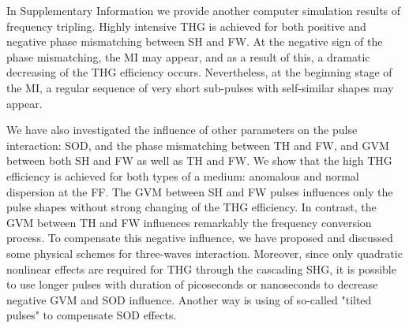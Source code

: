 \documentclass[a4paper, 12pt, onecolumn]{extarticle}
\begin{document}
In Supplementary Information we provide another computer simulation results of frequency tripling. Highly intensive THG is achieved for both positive and negative phase mismatching between SH and FW. At the negative sign of the phase mismatching, the MI may appear, and as a result of this, a dramatic decreasing of the THG efficiency occurs. Nevertheless, at the beginning stage of the MI, a regular sequence of very short sub-pulses with self-similar shapes may appear.

We have also investigated the influence of other parameters on the pulse interaction: SOD, and the phase mismatching between TH and FW, and GVM between both SH and FW as well as TH and FW.  We show that the high THG efficiency is achieved for both types of a medium: anomalous and normal dispersion at the FF. The GVM between SH and FW pulses influences only the pulse shapes without strong changing of the THG efficiency. In contrast, the GVM between TH and FW influences remarkably the frequency conversion process. To compensate this negative influence, we have proposed and discussed some physical schemes for three-waves interaction. Moreover, since only quadratic nonlinear effects are required for THG through the cascading SHG, it is possible to use longer pulses with duration of picoseconds or nanoseconds to decrease negative GVM and SOD influence. Another way is using of so-called "tilted pulses" \cite{bib:tilt1,bib:tilt2} to compensate SOD effects.
\end{document}
